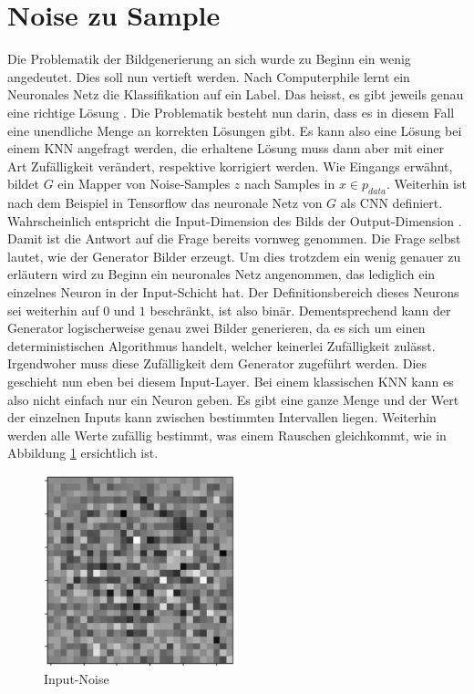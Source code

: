 \section{Noise zu Sample}
Die Problematik der Bildgenerierung an sich wurde zu Beginn ein wenig angedeutet. Dies soll nun vertieft
werden. Nach \glqq Computerphile \grqq{} lernt ein Neuronales Netz die Klassifikation auf ein Label. Das heisst, es gibt
jeweils genau eine richtige Lösung \cite[~t 4:00]{youtube:gan}. Die Problematik besteht nun darin, dass es in diesem Fall eine
unendliche Menge an korrekten Lösungen gibt. Es kann also eine Lösung bei einem \Gls{KNN} angefragt werden, die erhaltene
Lösung muss dann aber mit einer Art \glqq Zufälligkeit\grqq{} verändert, respektive korrigiert werden.
\para
Wie Eingangs erwähnt, bildet $G$ ein Mapper von Noise-Samples $z$ nach Samples in $x \in p_{data}$. Weiterhin ist nach
dem Beispiel in Tensorflow das neuronale Netz von $G$ als \Gls{CNN} definiert. Wahrscheinlich entspricht die Input-Dimension des
Bilds der Output-Dimension \cite{tensorflow:1:gan}. Damit ist die Antwort auf die Frage bereits vornweg genommen.
Die Frage selbst lautet, wie der Generator Bilder erzeugt. Um dies trotzdem ein wenig genauer zu erläutern wird zu Beginn
ein neuronales Netz angenommen, das lediglich ein einzelnes Neuron in der Input-Schicht hat. Der Definitionsbereich dieses Neurons sei
weiterhin auf $0$ und $1$ beschränkt, ist also binär. Dementsprechend kann der Generator logischerweise genau zwei Bilder
generieren, da es sich um einen deterministischen Algorithmus handelt, welcher keinerlei Zufälligkeit zulässt.
\para
Irgendwoher muss diese Zufälligkeit dem Generator zugeführt werden. Dies geschieht nun eben bei diesem Input-Layer.
Bei einem klassischen \Gls{KNN} kann es also nicht einfach nur ein Neuron geben. Es gibt eine ganze Menge und der Wert
der einzelnen Inputs kann zwischen bestimmten Intervallen liegen. Weiterhin werden alle Werte zufällig bestimmt,
was einem Rauschen gleichkommt, wie in Abbildung \ref{fig:Input-Noise} ersichtlich ist.
\begin{figure}[h!]
    \begin{center}
        \includegraphics[width=0.5\textwidth]{../common/02_main/resources/05_noise.png}
    \end{center}
    \caption{Input-Noise \cite{tensorflow:1:gan}}
    \label{fig:Input-Noise}
\end{figure}
